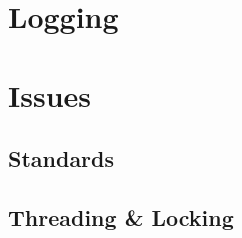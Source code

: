     \section{Logging}

    \section{Issues}
        \subsection{Standards}

        \subsection{Threading \& Locking}


